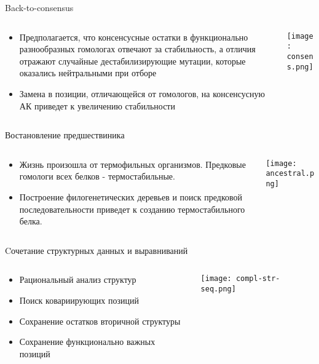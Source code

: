 \begin{frame}{Back-to-consensus}
\begin{columns}
\begin{column}{0.7\textwidth}
    \begin{itemize}
        \item Предполагается, что консенсусные остатки в функционально разнообразных гомологах отвечают за стабильность, а отличия отражают случайные дестабилизирующие мутации, которые оказались нейтральными при отборе
        \item Замена в позиции, отличающейся от гомологов, на консенсусную АК приведет к увеличению стабильности
    \end{itemize}
\end{column}
\begin{column}{0.3\textwidth}
    \texttt{[image: consens.png]}
\end{column}
\end{columns}
\end{frame}


\begin{frame}{Востановление предшествиника}
\begin{columns}
\begin{column}{0.6\textwidth}
    \begin{itemize}
        \item Жизнь произошла от термофильных организмов. Предковые гомологи всех белков - термостабильные.
        \item Построение филогенетических деревьев и поиск предковой последовательности приведет к созданию термостабильного белка.
    \end{itemize}
\end{column}
\begin{column}{0.4\textwidth}
    \texttt{[image: ancestral.png]}
\end{column}
\end{columns}
\end{frame}


\begin{frame}{Cочетание структурных данных и выравниваний}
\begin{columns}
\begin{column}{0.5\textwidth}
    \begin{itemize}
        \item Рациональный анализ структур
        \item Поиск ковариирующих позиций
        \item Сохранение остатков вторичной структуры
        \item Сохранение функционально важных позиций
    \end{itemize}
\end{column}
\begin{column}{0.5\textwidth}
    \texttt{[image: compl-str-seq.png]}
\end{column}
\end{columns}
\end{frame}



